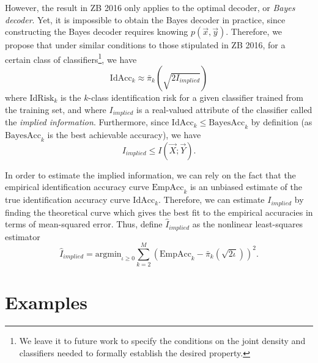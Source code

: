 However, the result in ZB 2016 only applies to the optimal decoder, or \emph{Bayes decoder}.  Yet, it is impossible to obtain the Bayes decoder in practice, since constructing the Bayes decoder requires knowing $p(\vec{x}, \vec{y})$.  Therefore, we propose that under similar conditions to those stipulated in ZB 2016, for a certain class of classifiers\footnote{We leave it to future work to specify the conditions on the joint density and classifiers needed to formally establish the desired property.}, we have
\[
\text{IdAcc}_k \approx \bar{\pi}_k(\sqrt{2 I_{implied}})
\]
where $\text{IdRisk}_k$ is the $k$-class identification risk for a given classifier trained from the training set,
and where $I_{implied}$ is a real-valued attribute of the classifier called the \emph{implied information}.
Furthermore, since $\text{IdAcc}_k \leq \text{BayesAcc}_k$ by definition (as $\text{BayesAcc}_k$ is the best achievable accuracy), we have
\[
I_{implied} \leq I(\vec{X}; \vec{Y}).
\]

In order to estimate the implied information, we can rely on the fact that the empirical identification accuracy curve $\text{EmpAcc}_k$ is an unbiased estimate of the true identification accuracy curve $\text{IdAcc}_k$.  Therefore, we can estimate $I_{implied}$ by finding the theoretical curve which gives the best fit to the empirical accuracies in terms of mean-squared error.  Thus, define $\hat{I}_{implied}$ as the nonlinear least-squares estimator
\[
\hat{I}_{implied} = \text{argmin}_{\iota \geq 0} \sum_{k=2}^{M} (\text{EmpAcc}_k - \bar{\pi}_k(\sqrt{2 \iota}))^2.
\]


\section{Examples}


